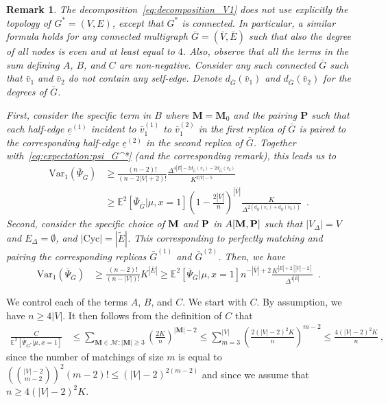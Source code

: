 \documentclass{article}
\newtheorem{remark}{Remark}
\begin{document}
\begin{remark}
The decomposition~\eqref{eq:decomposition_V1} does not use explicitly the topology of $G^*=(V,E)$, except that $G^*$ is connected. In particular, a similar formula holds for any connected multigraph $\bar{G}=(\bar{V},\bar{E})$ such that also the degree of all nodes is even and at least equal to $4$. Also, observe that all the terms in the sum defining $A$, $B$, and $C$ are non-negative. Consider any such connected $\bar{G}$ such that 
$\bar{v}_1$ and $\bar{v}_2$ do not contain any self-edge.  Denote $d_{\bar{G}}(\bar v_1)$ and $d_{\bar{G}}(\bar v_2)$ for the degrees of $\bar{G}$. 

First, consider the specific term in $B$ where $\mathbf{M}=\mathbf{M}_0$ and the pairing $\mathbf{P}$ such that each half-edge $\underline{e}^{(1)}$ incident to $\bar{v}^{(1)}_1$ to $\bar{v}^{(2)}_1$ in the first replica of $\bar{G}$ is paired to the corresponding half-edge  $\underline{e}^{(2)}$ in the second replica of $\bar{G}$. Together with~\eqref{eq:expectation:psi_G^*} (and the corresponding remark), this leads us  to 
\begin{align}\nonumber
\mathrm{Var}_1(\overline{\Psi}_{\bar{G}})& \geq \frac{(n-2)!}{(n-2|V|+2)!}\frac{\Delta^{4|\bar{E}|-2d_{\bar{G}}(v_1)-2d_{\bar{G}}(v_2)}}{K^{2|V|-5}}\\
&\geq \mathbb E^2[\overline{\Psi}_{\bar{G}}|\mu,x=1] \left(1- \frac{2|\bar{V}|}{n}\right)^{|\bar{V}|} \frac{K}{\Delta^{2(d_{\bar{G}}(\bar v_1)+d_{\bar{G}}(\bar v_2))}}\enspace . \label{eq:lower_variance}
\end{align}
Second, consider the specific choice of ${\bf M}$ and ${\bf P}$ in $A[{\bf M},{\bf P}]$ such that $|V_{\Delta}|=V$ and $E_{\Delta}=\emptyset$, and $|\mathrm{Cyc}|= |\tilde{E}|$. This corresponding to perfectly matching and pairing the corresponding replicas $\bar{G}^{(1)}$ and $\bar{G}^{(2)}$. Then, we have 
\begin{align} 
\mathrm{Var}_1(\overline{\Psi}_{\bar{G}})& \geq \frac{(n-2)!}{(n-|V|)!}K^{|\bar{E}|}
\geq \mathbb E^2[\overline{\Psi}_{\bar{G}}|\mu,x=1]  n^{-|\bar{V}|+2}\frac{K^{|\bar{E}|+2[|\bar{V}|-2]}}{\Delta^{4|\bar E|}} \enspace . \label{eq:lower_variance_2}
\end{align}


\end{remark}





We control each of the terms $A$, $B$, and $C$. We start with $C$. By assumption, we have $n\geq 4|V|$. It then follows from the definition of $C$ that 
\begin{align}\label{eq:bound:C}
\frac{C}{\mathbb E^2[\overline{\Psi}_{G^*}|\mu,x=1] } &\leq  \sum_{\mathbf{M}\in  \mathcal{M}: |\mathbf{M}|\geq 3 } \left(\frac{2K}{n}\right)^{|\mathbf M|-2}\leq  \sum_{m=3}^{|V|} \left(\frac{2(|V|-2)^2 K}{n}\right)^{m-2}\leq \frac{4(|V|-2)^2K}{n} \ , 
\end{align}
since the number of matchings of size $m$ is equal to 
$(\binom{|V|-2}{m-2})^2 (m-2)!\leq (|V|-2)^{2(m-2)}$ and since we assume that $n\geq 4(|V|-2)^2 K$. 
\end{document}
